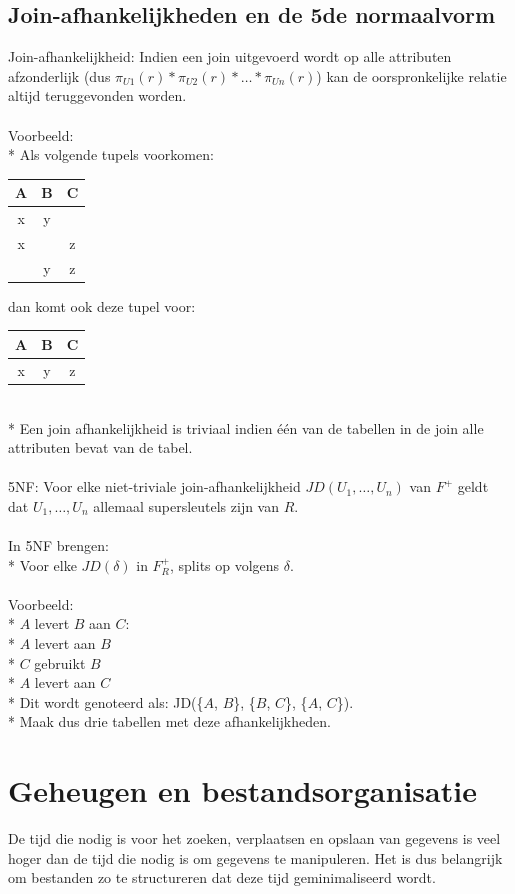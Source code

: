\documentclass[10pt]{article}
\begin{document}
\subsection{Join-afhankelijkheden en de 5de normaalvorm}
Join-afhankelijkheid: Indien een join uitgevoerd wordt op alle attributen afzonderlijk (dus $\pi_{U1}(r)*\pi_{U2}(r)*\dots*\pi_{Un}(r)$) kan de oorspronkelijke relatie altijd teruggevonden worden.\\\\
Voorbeeld:\\*
Als volgende tupels voorkomen:
\begin{tabular}{| c | c | c |} \hline
  A & B & C\\ \hline
  x & y & \\ \hline
  x &  & z\\ \hline
   & y & z\\ \hline
\end{tabular}
dan komt ook deze tupel voor:
\begin{tabular}{| c | c | c |} \hline
  A & B & C\\ \hline
  x & y & z\\ \hline
\end{tabular}\\*
Een join afhankelijkheid is triviaal indien \'e\'en van de tabellen in de join alle attributen bevat van de tabel.\\\\
5NF: Voor elke niet-triviale join-afhankelijkheid $JD(U_1, \dots, U_n)$ van $F^+$ geldt dat $U_1, \dots, U_n$ allemaal supersleutels zijn van $R$.\\\\
In 5NF brengen:\\*
Voor elke $JD(\delta)$ in $F^+_R$, splits op volgens $\delta$.\\\\
Voorbeeld:\\*
$A$ levert $B$ aan $C$:\\*
$A$ levert aan $B$\\*
$C$ gebruikt $B$\\*
$A$ levert aan $C$\\*
Dit wordt genoteerd als: JD(\{$A$, $B$\}, \{$B$, $C$\}, \{$A$, $C$\}).\\*
Maak dus drie tabellen met deze afhankelijkheden.
\section{Geheugen en bestandsorganisatie}
De tijd die nodig is voor het zoeken, verplaatsen en opslaan van gegevens is veel hoger dan de tijd die nodig is om gegevens te manipuleren. Het is dus belangrijk om bestanden zo te structureren dat deze tijd geminimaliseerd wordt.
\end{document}
